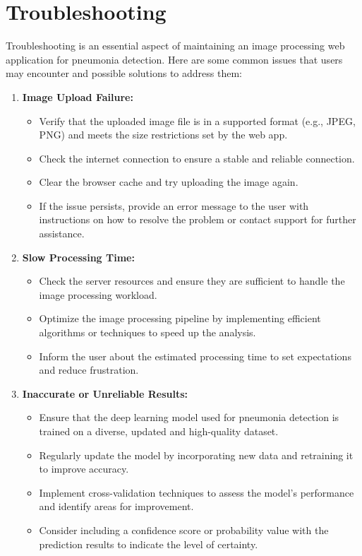 \section{Troubleshooting}

Troubleshooting is an essential aspect of maintaining an image processing web application for pneumonia detection. Here are some common issues that users may encounter and possible solutions to address them:


\begin{enumerate}
	\item \textbf{Image Upload Failure:}
	
     \begin{itemize}
     	\item Verify that the uploaded image file is in a supported format (e.g., JPEG, PNG) and meets the size restrictions set by the web app.
     	\item Check the internet connection to ensure a stable and reliable connection.
   		\item Clear the browser cache and try uploading the image again.
     	\item If the issue persists, provide an error message to the user with instructions on how to resolve the problem or contact support for further assistance.
     \end{itemize}
	
	\item \textbf{Slow Processing Time:}
	
	\begin{itemize}
		\item Check the server resources and ensure they are sufficient to handle the image processing workload.
	   \item Optimize the image processing pipeline by implementing efficient algorithms or techniques to speed up the analysis.
	  \item Inform the user about the estimated processing time to set expectations and reduce frustration.
		
	\end{itemize}
	
	\item \textbf{Inaccurate or Unreliable Results:}
	
\begin{itemize}
	\item 	Ensure that the deep learning model used for pneumonia detection is trained on a diverse, updated and high-quality dataset.
	\item 	Regularly update the model by incorporating new data and retraining it to improve accuracy.
	\item Implement cross-validation techniques to assess the model's performance and identify areas for improvement.
	\item 	Consider including a confidence score or probability value with the prediction results to indicate the level of certainty.
\end{itemize}
	

\end{enumerate}
